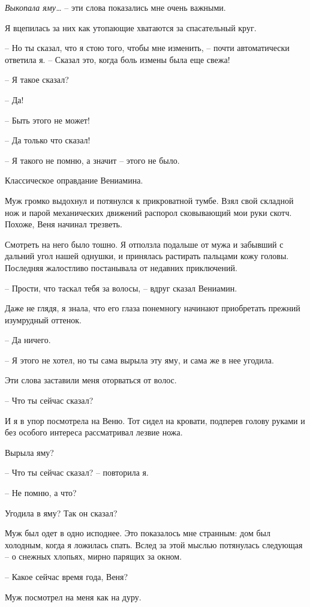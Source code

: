 \documentclass[
]{book}
\begin{document}
\emph{Выкопала яму\ldots{}} -- эти слова показались мне очень важными.

Я вцепилась за них как утопающие хватаются за спасательный круг.

-- Но ты сказал, что я стою того, чтобы мне изменить, -- почти автоматически ответила я. -- Сказал это, когда боль измены была еще свежа!

-- Я такое сказал?

-- Да!

-- Быть этого не может!

-- Да только что сказал!

-- Я такого не помню, а значит -- этого не было.

Классическое оправдание Вениамина.

Муж громко выдохнул и потянулся к прикроватной тумбе. Взял свой складной нож и парой механических движений распорол сковывающий мои руки скотч. Похоже, Веня начинал трезветь.

Смотреть на него было тошно. Я отползла подальше от мужа и забывший с дальний угол нашей однушки, и принялась растирать пальцами кожу головы. Последняя жалостливо постанывала от недавних приключений.

-- Прости, что таскал тебя за волосы, -- вдруг сказал Вениамин.

Даже не глядя, я знала, что его глаза понемногу начинают приобретать прежний изумрудный оттенок.

-- Да ничего.

-- Я этого не хотел, но ты сама вырыла эту яму, и сама же в нее угодила.

Эти слова заставили меня оторваться от волос.

-- Что ты сейчас сказал?

И я в упор посмотрела на Веню. Тот сидел на кровати, подперев голову руками и без особого интереса рассматривал лезвие ножа.

Вырыла яму?

-- Что ты сейчас сказал? -- повторила я.

-- Не помню, а что?

Угодила в яму? Так он сказал?

Муж был одет в одно исподнее. Это показалось мне странным: дом был холодным, когда я ложилась спать. Вслед за этой мыслью потянулась следующая -- о снежных хлопьях, мирно парящих за окном.

-- Какое сейчас время года, Веня?

Муж посмотрел на меня как на дуру.
\end{document}
